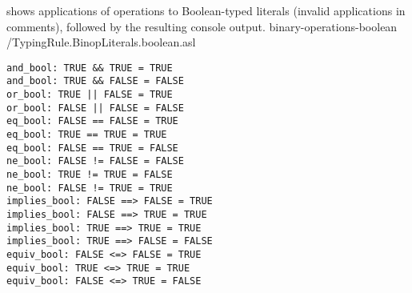 \FormallyParagraph
{}


 shows applications
of operations to Boolean-typed literals (invalid applications in comments),
followed by the resulting console output.
  {binary-operations-boolean}
  {\typingtests/TypingRule.BinopLiterals.boolean.asl}

\begin{Verbatim}[fontsize=\footnotesize, frame=single]
and_bool: TRUE && TRUE = TRUE
and_bool: TRUE && FALSE = FALSE
or_bool: TRUE || FALSE = TRUE
or_bool: FALSE || FALSE = FALSE
eq_bool: FALSE == FALSE = TRUE
eq_bool: TRUE == TRUE = TRUE
eq_bool: FALSE == TRUE = FALSE
ne_bool: FALSE != FALSE = FALSE
ne_bool: TRUE != TRUE = FALSE
ne_bool: FALSE != TRUE = TRUE
implies_bool: FALSE ==> FALSE = TRUE
implies_bool: FALSE ==> TRUE = TRUE
implies_bool: TRUE ==> TRUE = TRUE
implies_bool: TRUE ==> FALSE = FALSE
equiv_bool: FALSE <=> FALSE = TRUE
equiv_bool: TRUE <=> TRUE = TRUE
equiv_bool: FALSE <=> TRUE = FALSE
\end{Verbatim}

